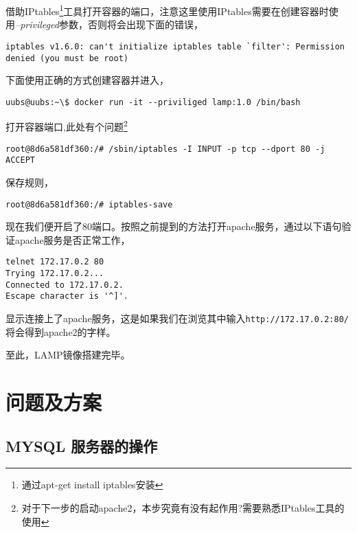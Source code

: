 \documentclass[a4]{article}
\begin{document}
借助IPtables\footnote{通过apt-get install iptables安装}工具打开容器的端口，注意这里使用IPtables需要在创建容器时使用\textit{--privileged}参数，否则将会出现下面的错误，
\begin{lstlisting}
iptables v1.6.0: can't initialize iptables table `filter': Permission denied (you must be root)
\end{lstlisting}

下面使用正确的方式创建容器并进入，
\begin{lstlisting}
uubs@uubs:~\$ docker run -it --priviliged lamp:1.0 /bin/bash
\end{lstlisting}

打开容器端口,此处有个问题\footnote{对于下一步的启动apache2，本步究竟有没有起作用?需要熟悉IPtables工具的使用}
\begin{lstlisting}
root@8d6a581df360:/# /sbin/iptables -I INPUT -p tcp --dport 80 -j ACCEPT
\end{lstlisting}

保存规则，
\begin{lstlisting}
root@8d6a581df360:/# iptables-save
\end{lstlisting}

现在我们便开启了80端口。按照之前提到的方法打开apache服务，通过以下语句验证apache服务是否正常工作，
\begin{lstlisting}
telnet 172.17.0.2 80
Trying 172.17.0.2...
Connected to 172.17.0.2.
Escape character is '^]'.
\end{lstlisting}

显示连接上了apache服务，这是如果我们在浏览其中输入\lstinline{http://172.17.0.2:80/}将会得到apache2的字样。

至此，LAMP镜像搭建完毕。

\section{问题及方案}
\subsection{MYSQL 服务器的操作} 
\end{document}
